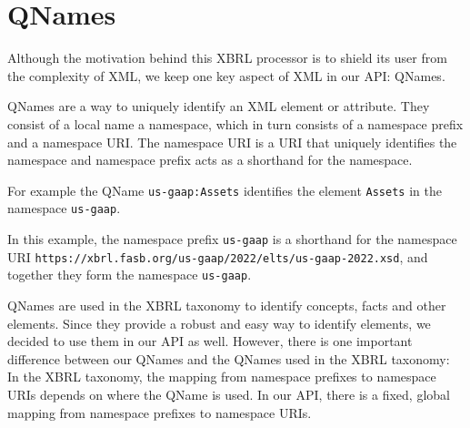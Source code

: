 \section{QNames}

Although the motivation behind this XBRL processor is to shield its user from the complexity of XML, 
we keep one key aspect of XML in our API: QNames.

QNames are a way to uniquely identify an XML element or attribute. 
They consist of a local name a namespace, which in turn consists of a namespace prefix and a namespace URI. 
The namespace URI is a URI that uniquely identifies the namespace and namespace prefix acts as a shorthand for the namespace.

For example the QName \texttt{us-gaap:Assets} identifies the element \texttt{Assets} in the namespace \texttt{us-gaap}.

In this example, the namespace prefix \texttt{us-gaap} is a shorthand for the namespace URI \texttt{https://xbrl.fasb.org/us-gaap/2022/elts/us-gaap-2022.xsd}, 
and together they form the namespace \texttt{us-gaap}.

QNames are used in the XBRL taxonomy to identify concepts, facts and other elements. Since they provide a robust and easy way to identify elements,
we decided to use them in our API as well. However, there is one important difference between our QNames and the QNames used in the XBRL taxonomy:
In the XBRL taxonomy, the mapping from namespace prefixes to namespace URIs depends on where the QName is used. 
In our API, there is a fixed, global mapping from namespace prefixes to namespace URIs.




    
    
    
